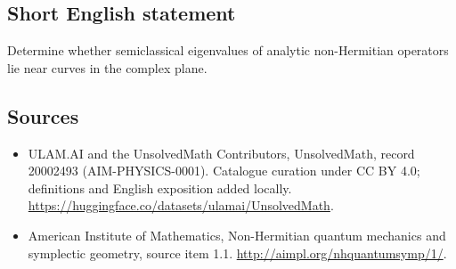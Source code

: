 \documentclass[11pt]{article}
\begin{document}
\subsection{Short English statement}
Determine whether semiclassical eigenvalues of analytic non-Hermitian operators lie near curves in the complex plane.
\subsection{Sources}
\begin{itemize}
\item[\hypertarget{source:20002493:1}{S1}] ULAM.AI and the UnsolvedMath Contributors, UnsolvedMath, record 20002493 (AIM-PHYSICS-0001). Catalogue curation under CC BY 4.0; definitions and English exposition added locally.
\url{https://huggingface.co/datasets/ulamai/UnsolvedMath}.
\item[\hypertarget{source:20002493:2}{S2}] American Institute of Mathematics, Non-Hermitian quantum mechanics and symplectic geometry, source item 1.1.
\url{http://aimpl.org/nhquantumsymp/1/}.
\end{itemize}
\label{end:20002493}
\end{document}
